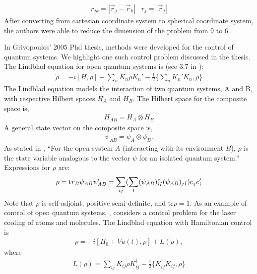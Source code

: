 \documentclass[]{article}
\begin{document}
\begin{eqnarray}
r_{jk}=|\vec{r}_{j}-\vec{r}_{k}| \hspace{10pt} r_{j}=|\vec{r}_{j}|
\end{eqnarray}
After converting from cartesian coordinate system to spherical 
coordinate system, the authors were able to reduce the dimension of the
problem from 9 to 6.
\par\noindent
In Grivopoulos' 2005 Phd thesis\cite{grivopoulos2005optimal}, methods
were developed for the control of quantum systems.  We 
highlight one such control problem discussed in the thesis. 
The Lindblad equation\cite{manzano2020short,lidar2019lecture} 
for open quantum systems is
(see 3.7 in 
\cite{grivopoulos2005optimal}):
\begin{eqnarray}
	\dot{\rho}=-i[H,\rho]+
	\sum_{n} K_{n}\rho K_{n}' -\frac{1}{2}
	\{\sum_{n} K_{n}'K_{n},\rho\}
\end{eqnarray}
The Lindblad equation models the interaction of two quantum systems, 
A and B, with respective Hilbert spaces $H_{A}$ and $H_{B}$.  The
Hilbert space for the composite space is,
\begin{eqnarray}
	H_{AB}=H_{A}\otimes H_{B}
\end{eqnarray}
A general state vector on the composite space is,
\begin{eqnarray}
	\psi_{AB}=\psi_{A}\otimes\psi_{B}.
\end{eqnarray}
As stated in 
\cite{grivopoulos2005optimal},
``For the open system $A$ (interacting with its environment $B$), $\rho$ is 
the state variable analogous to the vector $\psi$ for an 
isolated quantum system.'' Expressions for $\rho$ are:
\begin{eqnarray}
	\rho={\mbox tr}_{B}\psi_{AB}\psi_{AB}'=
	\sum_{ij}(\sum_{I}(\psi_{AB})^{\ast}_{iI}
	(\psi_{AB})_{jI})e_{j}e_{i}'
\end{eqnarray}
Note that $\rho$ is self-adjoint, positive semi-definite, and
$\mbox{tr}\rho=1$.  As an example of control of open quantum systems,
\cite{grivopoulos2005optimal},
considers a control problem for the laser cooling of atoms and 
molecules.   The Lindblad equation with Hamiltonian control is
\begin{eqnarray}
	\dot{\rho}=-i[H_{0}+V u(t),\rho]+L(\rho), \label{control}
\end{eqnarray}
where
\begin{eqnarray}
	L(\rho)=\sum_{ij}K_{ij}\rho K_{ij}^{\dag}-\frac{1}{2}
	\{K_{ij}^{\dag}K_{ij},\rho\}
\end{eqnarray}
\end{document}
